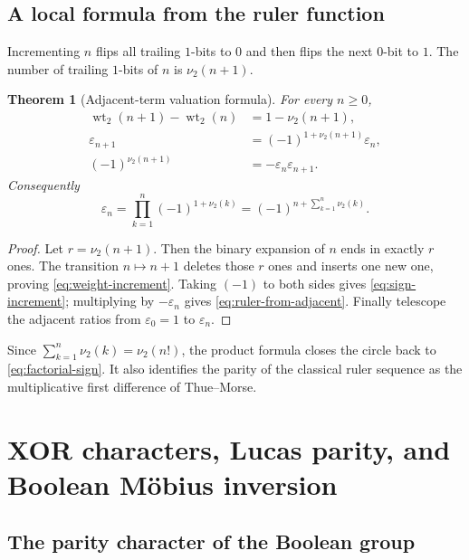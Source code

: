 \documentclass[11pt,oneside]{article}
\newtheorem{theorem}{Theorem}[section]
\theoremstyle{definition}
\theoremstyle{remark}
\newcommand{\wt}{\operatorname{wt}_2}
\newcommand{\vtwo}{\nu_2}
\begin{document}
\subsection{A local formula from the ruler function}

Incrementing $n$ flips all trailing $1$-bits to $0$ and then flips the next
$0$-bit to $1$.  The number of trailing $1$-bits of $n$ is $\vtwo(n+1)$.

\begin{theorem}[Adjacent-term valuation formula]
\label{thm:adjacent-term}
For every $n\ge0$,
\begin{align}
  \wt(n+1)-\wt(n)&=1-\vtwo(n+1),                            \label{eq:weight-increment}\\
  \varepsilon_{n+1}&=(-1)^{1+\vtwo(n+1)}\varepsilon_n,     \label{eq:sign-increment}\\
  (-1)^{\vtwo(n+1)}&=-\varepsilon_n\varepsilon_{n+1}.      \label{eq:ruler-from-adjacent}
\end{align}
Consequently
\begin{equation}
  \boxed{\displaystyle
  \varepsilon_n=
  \prod_{k=1}^{n}(-1)^{1+\vtwo(k)}
  =(-1)^{n+\sum_{k=1}^{n}\vtwo(k)}.}                       \label{eq:ruler-product}
\end{equation}
\end{theorem}

\begin{proof}
Let $r=\vtwo(n+1)$.  Then the binary expansion of $n$ ends in exactly $r$ ones.
The transition $n\mapsto n+1$ deletes those $r$ ones and inserts one new one,
proving \eqref{eq:weight-increment}.  Taking $(-1)$ to both sides gives
\eqref{eq:sign-increment}; multiplying by $-\varepsilon_n$ gives
\eqref{eq:ruler-from-adjacent}.  Finally telescope the adjacent ratios from
$\varepsilon_0=1$ to $\varepsilon_n$.
\end{proof}

Since $\sum_{k=1}^{n}\vtwo(k)=\vtwo(n!)$, the product formula closes the circle
back to \eqref{eq:factorial-sign}.  It also identifies the parity of the classical
ruler sequence as the multiplicative first difference of Thue--Morse.

\section{XOR characters, Lucas parity, and Boolean Möbius inversion}
\label{sec:boolean}

\subsection{The parity character of the Boolean group}
\end{document}

